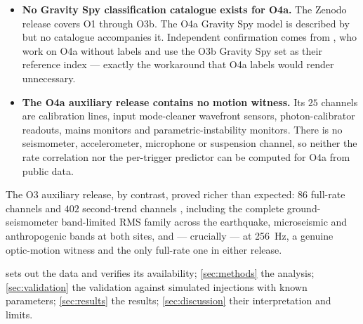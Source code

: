 \begin{itemize}
  \item \textbf{No Gravity Spy classification catalogue exists for O4a.} The
        Zenodo release \citep{GravitySpyData2021} covers O1 through O3b. The
        O4a Gravity Spy model is described by \citet{Wu2025} but no catalogue
        accompanies it. Independent confirmation comes from
        \citet{Cirfeta2026}, who work on O4a without labels and use the O3b
        Gravity Spy set as their reference index --- exactly the workaround
        that O4a labels would render unnecessary.
  \item \textbf{The O4a auxiliary release contains no motion witness.} Its
        $25$ channels \citep{GWOSCO4Aux} are calibration lines, input
        mode-cleaner wavefront sensors, photon-calibrator readouts, mains
        monitors and parametric-instability monitors. There is no
        seismometer, accelerometer, microphone or suspension channel, so
        neither the rate correlation nor the per-trigger predictor can be
        computed for O4a from public data.
\end{itemize}

The O3 auxiliary release, by contrast, proved richer than expected:
$86$ full-rate channels and $402$ second-trend channels
\citep{GWOSCO3Aux}, including the complete ground-seismometer band-limited RMS
family across the earthquake, microseismic and anthropogenic bands at both
sites, and --- crucially ---  at
\SI{256}{\hertz}, a genuine optic-motion witness and the only full-rate one in
either release.

 sets out the data and verifies its availability;
\cref{sec:methods} the analysis; \cref{sec:validation} the validation against
simulated injections with known parameters; \cref{sec:results} the results;
\cref{sec:discussion} their interpretation and limits.
